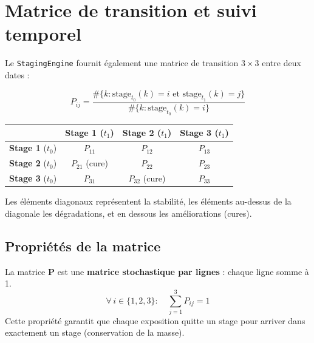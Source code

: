\documentclass[12pt,a4paper]{article}
\begin{document}
\newpage
\section{Matrice de transition et suivi temporel}

Le \texttt{StagingEngine} fournit \'egalement une matrice de transition $3 \times 3$ entre deux dates :

\begin{formulebox}
\begin{equation}
P_{ij} = \frac{\#\{k : \text{stage}_{t_0}(k) = i \text{ et } \text{stage}_{t_1}(k) = j\}}{\#\{k : \text{stage}_{t_0}(k) = i\}}
\end{equation}
\end{formulebox}

\begin{center}
\begin{tabular}{l|ccc}
\toprule
& \textbf{Stage 1} ($t_1$) & \textbf{Stage 2} ($t_1$) & \textbf{Stage 3} ($t_1$) \\
\midrule
\textbf{Stage 1} ($t_0$) & $P_{11}$ & $P_{12}$ & $P_{13}$ \\
\textbf{Stage 2} ($t_0$) & $P_{21}$ (cure) & $P_{22}$ & $P_{23}$ \\
\textbf{Stage 3} ($t_0$) & $P_{31}$ & $P_{32}$ (cure) & $P_{33}$ \\
\bottomrule
\end{tabular}
\end{center}

Les \'el\'ements diagonaux repr\'esentent la stabilit\'e, les \'el\'ements au-dessus de la diagonale les d\'egradations, et en dessous les am\'eliorations (cures).

\subsection{Propri\'et\'es de la matrice}

\begin{definitionbox}
La matrice $\mathbf{P}$ est une \textbf{matrice stochastique par lignes} : chaque ligne somme \`a 1.
\begin{equation}
\forall\, i \in \{1, 2, 3\} : \quad \sum_{j=1}^{3} P_{ij} = 1
\end{equation}
Cette propri\'et\'e garantit que chaque exposition quitte un stage pour arriver dans exactement un stage (conservation de la masse).
\end{definitionbox}
\end{document}
